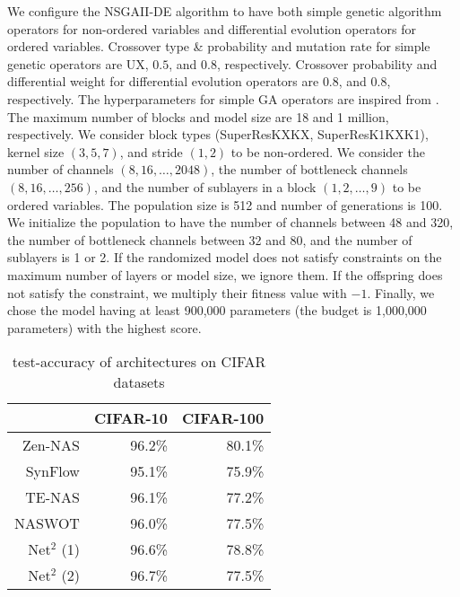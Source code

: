 \documentclass[lettersize,journal]{IEEEtran}
\begin{document}
            We configure the NSGAII-DE algorithm to have both simple genetic algorithm operators for non-ordered variables and differential evolution operators for ordered variables. Crossover type \& probability and mutation rate for simple genetic operators are UX, $0.5$, and $0.8$, respectively. Crossover probability and differential weight for differential evolution operators are $0.8$, and $0.8$, respectively. The hyperparameters for simple GA operators are inspired from \cite{Genetic}. The maximum number of blocks and model size are 18 and 1 million, respectively. We consider block types (SuperResKXKX, SuperResK1KXK1), kernel size $(3, 5, 7)$, and stride $(1, 2)$ to be non-ordered. We consider the number of channels $(8, 16, \ldots, 2048)$, the number of bottleneck channels $(8, 16, \ldots, 256)$, and the number of sublayers in a block $(1, 2,\ldots, 9)$ to be ordered variables. The population size is 512 and number of generations is 100. We initialize the population to have the number of channels between 48 and 320, the number of bottleneck channels between 32 and 80, and the number of sublayers is 1 or 2. If the randomized model does not satisfy constraints on the maximum number of layers or model size, we ignore them. If the offspring does not satisfy the constraint, we multiply their fitness value with $-1$. Finally, we chose the model having at least 900,000 parameters (the budget is 1,000,000 parameters) with the highest score.

            \begin{table} 
                \caption{test-accuracy of architectures on CIFAR datasets}
                \label{tab:E2E}
                \centering
                \begin{tabular}{r|rr}
                \toprule
                    & CIFAR-10 & CIFAR-100\\
                    \midrule
                    Zen-NAS \cite{Zen-NAS} & 96.2\% & 80.1\% \\
                    SynFlow \cite{LightweightNAS} & 95.1\% & 75.9\% \\
                    TE-NAS \cite{TE-NAS} & 96.1\% & 77.2\% \\
                    NASWOT \cite{naswot} & 96.0\% & 77.5\%\\
                    Net$^2$ (1) & 96.6\% & 78.8\% \\
                    Net$^2$ (2) & 96.7\% & 77.5\% \\
                \bottomrule
            \end{tabular}
            \end{table}
\end{document}
